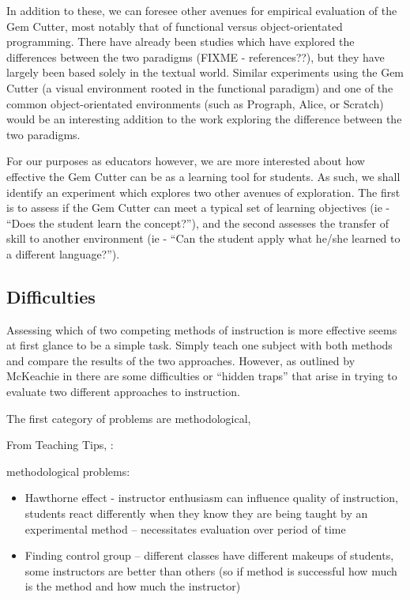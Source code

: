 In addition to these, we can foresee other avenues for empirical evaluation of the Gem Cutter, most notably that of functional versus object-orientated programming.  There have already been studies which have explored the differences between the two paradigms (FIXME - references??), but they have largely been based solely in the textual world.  Similar experiments using the Gem Cutter (a visual environment rooted in the functional paradigm) and one of the common object-orientated environments (such as Prograph, Alice, or Scratch) would be an interesting addition to the work exploring the difference between the two paradigms.

For our purposes as educators however, we are more interested about how effective the Gem Cutter can be as a learning tool for students.  As such, we shall identify an experiment which explores two other avenues of exploration.  The first is to assess if the Gem Cutter can meet a typical set of learning objectives (ie - ``Does the student learn the concept?''), and the second assesses the transfer of skill to another environment (ie - ``Can the student apply what he/she learned to a different language?'').

\subsection{Difficulties}

Assessing which of two competing methods of instruction is more effective seems at first glance to be a simple task.  Simply teach one subject with both methods and compare the results of the two approaches.  However, as outlined by McKeachie in \cite{teachingTips} there are some difficulties or ``hidden traps'' that arise in trying to evaluate two different approaches to instruction.

The first category of problems are methodological, 

From Teaching Tips, \cite{teachingTips}:

methodological problems:

\begin{itemize}
	\item Hawthorne effect - instructor enthusiasm can influence quality of instruction, students react differently when they know they are being taught by an experimental method -- necessitates evaluation over period of time
	\item Finding control group -- different classes have different makeups of students, some instructors are better than others (so if method is successful how much is the method and how much the instructor)
\end{itemize}

